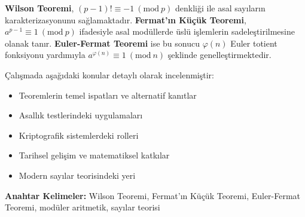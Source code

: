\textbf{Wilson Teoremi}, $(p-1)! \equiv -1 \ (\mathrm{mod}\ p)$ denkliği ile asal sayıların karakterizasyonunu sağlamaktadır. \textbf{Fermat'ın Küçük Teoremi}, $a^{p-1} \equiv 1 \ (\mathrm{mod}\ p)$ ifadesiyle asal modüllerde üslü işlemlerin sadeleştirilmesine olanak tanır. \textbf{Euler-Fermat Teoremi} ise bu sonucu $\varphi(n)$ Euler totient fonksiyonu yardımıyla $a^{\varphi(n)} \equiv 1 \ (\mathrm{mod}\ n)$ şeklinde genelleştirmektedir.

Çalışmada aşağıdaki konular detaylı olarak incelenmiştir:

\begin{itemize}
    \item Teoremlerin temel ispatları ve alternatif kanıtlar
    \item Asallık testlerindeki uygulamaları
    \item Kriptografik sistemlerdeki rolleri
    \item Tarihsel gelişim ve matematiksel katkılar
    \item Modern sayılar teorisindeki yeri
\end{itemize}

\vspace{1cm}
\noindent\textbf{Anahtar Kelimeler:} Wilson Teoremi, Fermat'ın Küçük Teoremi, Euler-Fermat Teoremi, modüler aritmetik, sayılar teorisi
